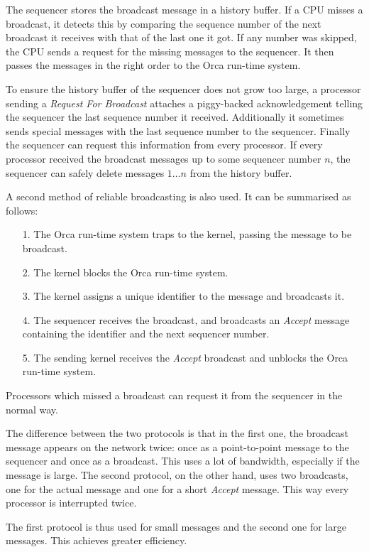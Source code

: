 The sequencer stores the broadcast message in a history buffer. If a
CPU misses a broadcast, it detects this by comparing the sequence
number of the next broadcast it receives with that of the last one it
got. If any number was skipped, the CPU sends a request for the missing
messages to the sequencer. It then passes the messages in the right
order to the Orca run-time system.

To ensure the history buffer of the sequencer does not grow too large, a
processor sending a {\em Request For Broadcast} attaches a piggy-backed
acknowledgement telling the sequencer the last sequence number it
received. Additionally it sometimes sends special messages with the
last sequence number
to the sequencer. Finally the sequencer can request this information from
every processor. If every processor received the broadcast messages up to
some sequencer number $n$, the sequencer can safely delete messages
$1 \ldots n$ from the history buffer.

A second method of reliable broadcasting is also used. It can be
summarised as follows:
\begin{itemize}
        \item[1.] The Orca run-time system traps to the kernel, passing the message to
        be broadcast.
        \item[2.] The kernel blocks the Orca run-time system.
        \item[3.] The kernel assigns a unique identifier to the
        message and broadcasts it.
        \item[4.] The sequencer receives the broadcast, and broadcasts an
        {\em Accept} message containing the identifier and the next
        sequencer number.
        \item[5.] The sending kernel receives the {\em Accept} broadcast
        and unblocks the Orca run-time system.
\end{itemize}
Processors which missed a broadcast can request it from the sequencer in
the normal way.

The difference between the two protocols is that in the first one, the
broadcast message appears on the network twice: once as a point-to-point
message to the sequencer and once as a broadcast. This uses a lot of
bandwidth, especially if the message is large. The second protocol, on
the other hand, uses two broadcasts, one for the actual message and one
for a short {\em Accept} message. This way every processor is interrupted
twice.

The first protocol is thus used for small messages and the second one
for large messages. This achieves greater efficiency.


